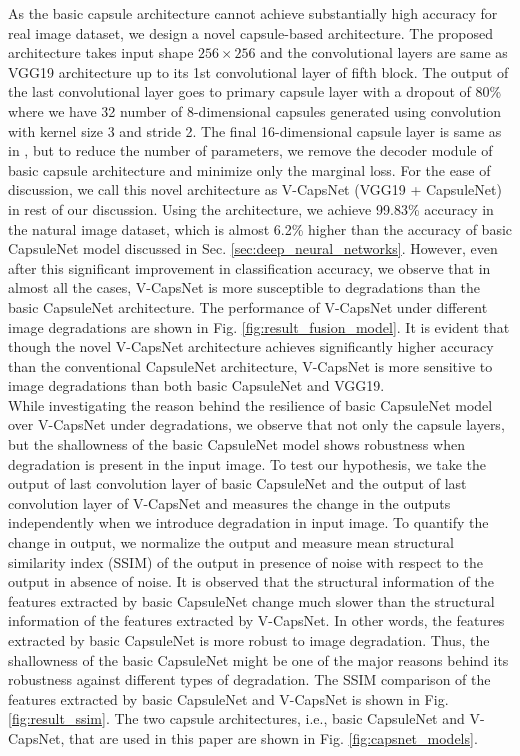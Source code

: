 \documentclass[10pt, journal, compsoc]{IEEEtran}
\begin{document}
As the basic capsule architecture cannot achieve substantially high accuracy for real image dataset, we design a novel capsule-based architecture. The proposed architecture takes input shape $256\times256$ and the convolutional layers are same as VGG19 architecture up to its 1st convolutional layer of fifth block. The output of the last convolutional layer goes to primary capsule layer with a dropout of 80\% where we have 32 number of 8-dimensional capsules generated using convolution with kernel size 3 and stride 2. The final 16-dimensional capsule layer is same as in \cite{sabour2017dynamic}, but to reduce the number of parameters, we remove the decoder module of basic capsule architecture and minimize only the marginal loss. For the ease of discussion, we call this novel architecture as V-CapsNet (VGG19 + CapsuleNet) in rest of our discussion. Using the architecture, we achieve 99.83\% accuracy in the natural image dataset, which is almost 6.2\% higher than the accuracy of basic CapsuleNet model discussed in Sec. \ref{sec:deep_neural_networks}. However, even after this significant improvement in classification accuracy, we observe that in almost all the cases, V-CapsNet is more susceptible to degradations than the basic CapsuleNet architecture. The performance of V-CapsNet under different image degradations are shown in Fig. \ref{fig:result_fusion_model}. It is evident that though the novel V-CapsNet architecture achieves significantly higher accuracy than the conventional CapsuleNet architecture, V-CapsNet is more sensitive to image degradations than both basic CapsuleNet and VGG19.\\
While investigating the reason behind the resilience of basic CapsuleNet model over V-CapsNet under degradations, we observe that not only the capsule layers, but the shallowness of the basic CapsuleNet model shows robustness when degradation is present in the input image. To test our hypothesis, we take the output of last convolution layer of basic CapsuleNet and the output of last convolution layer of V-CapsNet and measures the change in the outputs independently when we introduce degradation in input image. To quantify the change in output, we normalize the output and measure mean structural similarity index (SSIM) \cite{wang2004image} of the output in presence of noise with respect to the output in absence of noise. It is observed that the structural information of the features extracted by basic CapsuleNet change much slower than the structural information of the features extracted by V-CapsNet. In other words, the features extracted by basic CapsuleNet is more robust to image degradation. Thus, the shallowness of the basic CapsuleNet might be one of the major reasons behind its robustness against different types of degradation. The SSIM comparison of the features extracted by basic CapsuleNet and V-CapsNet is shown in Fig. \ref{fig:result_ssim}. The two capsule architectures, i.e., basic CapsuleNet and V-CapsNet, that are used in this paper are shown in Fig. \ref{fig:capsnet_models}.
\end{document}
